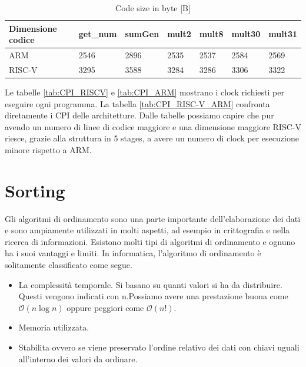 \documentclass[12pt, a4paper]{report}
\begin{document}
\begin{table}[h]
\centering
\begin{tabular}{|l|l|l|l|l|l|l|}
\hline
Dimensione codice & get\_num & sumGen & mult2 & mult8 & mult30 & mult31 \\ \hline
ARM           & 2546     & 2896   & 2535  & 2537  & 2584   & 2569   \\ \hline
RISC-V               & 3295     & 3588   & 3284  & 3286  & 3306   & 3322   \\ \hline
\end{tabular}
\caption{Code size in byte [B]}
\end{table}

Le tabelle \ref{tab:CPI_RISCV} e \ref{tab:CPI_ARM} mostrano i clock richiesti per eseguire ogni programma. La tabella \ref{tab:CPI_RISC-V_ARM} confronta diretamente i CPI delle architetture. Dalle tabelle possiamo capire che pur avendo un numero di linee di codice maggiore e una dimensione maggiore RISC-V riesce, grazie alla struttura in 5 stages, a avere un numero di clock per esecuzione minore rispetto a ARM. %





\newpage
\section{Sorting}
Gli algoritmi di ordinamento sono una parte importante dell'elaborazione dei dati e sono ampiamente utilizzati in molti aspetti, ad esempio in crittografia e nella ricerca di informazioni. Esistono molti tipi di algoritmi di ordinamento e ognuno ha i suoi vantaggi e limiti. In informatica, l'algoritmo di ordinamento è solitamente classificato come segue.

\begin{itemize}
	\item La complessità temporale. Si basano su quanti valori si ha da distribuire. Questi vengono indicati con n.Possiamo avere una prestazione buona come $\mathcal{O}(n\log{}n)$ oppure peggiori come $\mathcal{O}(n!)$.
	\item Memoria utilizzata.
	\item Stabilita ovvero se viene preservato l'ordine relativo dei dati con chiavi uguali all'interno dei valori da ordinare.
\end{itemize}
\end{document}
